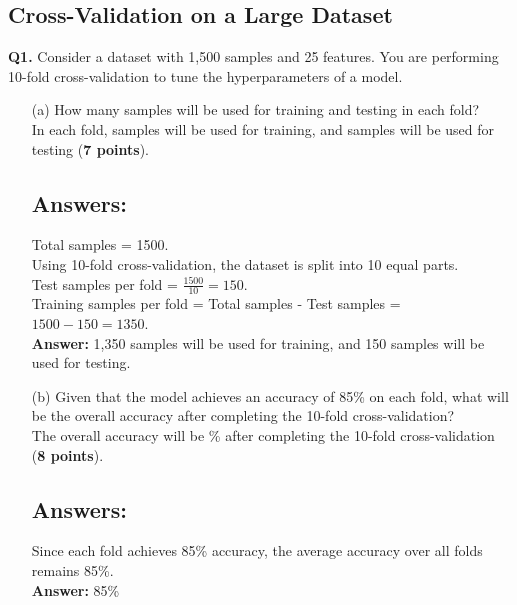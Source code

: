 \documentclass{article}
\begin{document}
\subsection*{Cross-Validation on a Large Dataset}
\textbf{Q1.} Consider a dataset with 1,500 samples and 25 features. You are
performing 10-fold cross-validation to tune the hyperparameters of a model.
\begin{enumerate}
      \item[(a)] How many samples will be used for training and testing in each fold?
            \\
            In each fold, \underline{\hspace{3cm}} samples will be used for training, and \underline{\hspace{3cm}} samples will be used for testing (\textbf{7 points}).
            \subsection*{Answers:}
            Total samples = 1500. \\
            Using 10-fold cross-validation, the dataset is split into 10 equal parts. \\
            Test samples per fold = $\frac{1500}{10} = 150$. \\
            Training samples per fold = Total samples - Test samples = $1500 - 150 = 1350$. \\
            \textbf{Answer:} 1,350 samples will be used for training, and 150 samples will be used for testing.
      \item[(b)] Given that the model achieves an accuracy of 85\% on each fold, what
            will be the overall accuracy after completing the 10-fold cross-validation? \\
            The overall accuracy will be \underline{\hspace{3cm}} \% after completing the
            10-fold cross-validation (\textbf{8 points}).
            \subsection*{Answers:}
            Since each fold achieves 85\% accuracy, the average accuracy over all folds remains 85\%. \\
            \textbf{Answer:} 85\%
\end{enumerate}
\newpage
\end{document}
